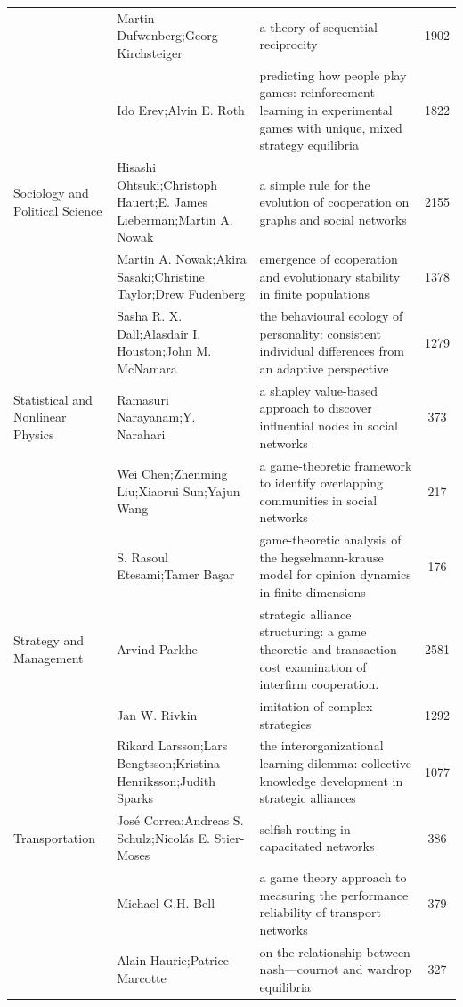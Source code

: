 \documentclass[
  12pt,
]{article}
\begin{document}
\begin{longtable}[t]{|>{\raggedright\arraybackslash}p{4cm}>{\raggedright\arraybackslash}p{4cm}>{\raggedright\arraybackslash}p{4cm}>{}c|}
 & Martin Dufwenberg;Georg Kirchsteiger & a theory of sequential reciprocity & 1902\\
 & Ido Erev;Alvin E. Roth & predicting how people play games: reinforcement learning in experimental games with unique, mixed strategy equilibria & 1822\\
Sociology and Political Science & Hisashi Ohtsuki;Christoph Hauert;E. James Lieberman;Martin A. Nowak & a simple rule for the evolution of cooperation on graphs and social networks & 2155\\
 & Martin A. Nowak;Akira Sasaki;Christine Taylor;Drew Fudenberg & emergence of cooperation and evolutionary stability in finite populations & 1378\\
 & Sasha R. X. Dall;Alasdair I. Houston;John M. McNamara & the behavioural ecology of personality: consistent individual differences from an adaptive perspective & 1279\\
Statistical and Nonlinear Physics & Ramasuri Narayanam;Y. Narahari & a shapley value-based approach to discover influential nodes in social networks & 373\\
 & Wei Chen;Zhenming Liu;Xiaorui Sun;Yajun Wang & a game-theoretic framework to identify overlapping communities in social networks & 217\\
 & S. Rasoul Etesami;Tamer Başar & game-theoretic analysis of the hegselmann-krause model for opinion dynamics in finite dimensions & 176\\
Strategy and Management & Arvind Parkhe & strategic alliance structuring: a game theoretic and transaction cost examination of interfirm cooperation. & 2581\\
 & Jan W. Rivkin & imitation of complex strategies & 1292\\
 & Rikard Larsson;Lars Bengtsson;Kristina Henriksson;Judith Sparks & the interorganizational learning dilemma: collective knowledge development in strategic alliances & 1077\\
Transportation & José Correa;Andreas S. Schulz;Nicolás E. Stier‐Moses & selfish routing in capacitated networks & 386\\
 & Michael G.H. Bell & a game theory approach to measuring the performance reliability of transport networks & 379\\
 & Alain Haurie;Patrice Marcotte & on the relationship between nash—cournot and wardrop equilibria & 327\\
\bottomrule
\end{longtable}
\endgroup{}
\end{document}
